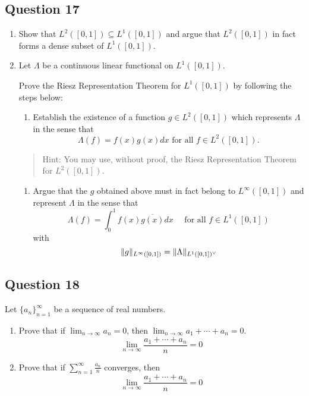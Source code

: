 \documentclass[12pt]{article}
\providecommand{\tightlist}{%
  \setlength{\itemsep}{0pt}\setlength{\parskip}{0pt}}
\begin{document}
\hypertarget{question-17-1}{%
\subsection{Question 17}\label{question-17-1}}

\begin{enumerate}
\def\labelenumi{\alph{enumi}.}
\item
  Show that \(L^2([0, 1]) \subseteq L^1([0, 1])\) and argue that
  \(L^2([0, 1])\) in fact forms a dense subset of \(L^1([0, 1])\).
\item
  Let \(\Lambda\) be a continuous linear functional on \(L^1([0, 1])\).

  Prove the Riesz Representation Theorem for \(L^1([0, 1])\) by
  following the steps below:

  \begin{enumerate}
  \def\labelenumii{\roman{enumii}.}
  \tightlist
  \item
    Establish the existence of a function \(g \in L^2([0, 1])\) which
    represents \(\Lambda\) in the sense that \[
    \Lambda(f ) = f (x)g(x) dx \text{ for all } f \in L^2([0, 1]).
    \]
  \end{enumerate}

  \begin{quote}
  Hint: You may use, without proof, the Riesz Representation Theorem for
  \(L^2([0, 1])\).
  \end{quote}

  \begin{enumerate}
  \def\labelenumii{\roman{enumii}.}
  \setcounter{enumii}{1}
  \tightlist
  \item
    Argue that the \(g\) obtained above must in fact belong to
    \(L^\infty([0, 1])\) and represent \(\Lambda\) in the sense that \[
    \Lambda(f)=\int_{0}^{1} f(x) \overline{g(x)} d x \quad \text { for all } f \in L^{1}([0,1])
    \] with \[
    \|g\|_{L^{\infty}([0,1])}=\|\Lambda\|_{L^{1}([0,1])^\vee}
    \]
  \end{enumerate}
\end{enumerate}

\hypertarget{question-18-1}{%
\subsection{Question 18}\label{question-18-1}}

Let \(\{a_n\}_{n=1}^\infty\) be a sequence of real numbers.

\begin{enumerate}
\def\labelenumi{\alph{enumi}.}
\item
  Prove that if \(\displaystyle\lim_{n\to\infty} a_n = 0\), then
  \(\displaystyle\lim_{n\to\infty} a_1 + \cdots + a_n = 0\). \[
  \lim _{n \rightarrow \infty} \frac{a_{1}+\cdots+a_{n}}{n}=0
  \]
\item
  Prove that if \(\displaystyle\sum_{n=1}^{\infty} \frac{a_{n}}{n}\)
  converges, then \[
  \lim _{n \rightarrow \infty} \frac{a_{1}+\cdots+a_{n}}{n}=0
  \]
\end{enumerate}
\end{document}
